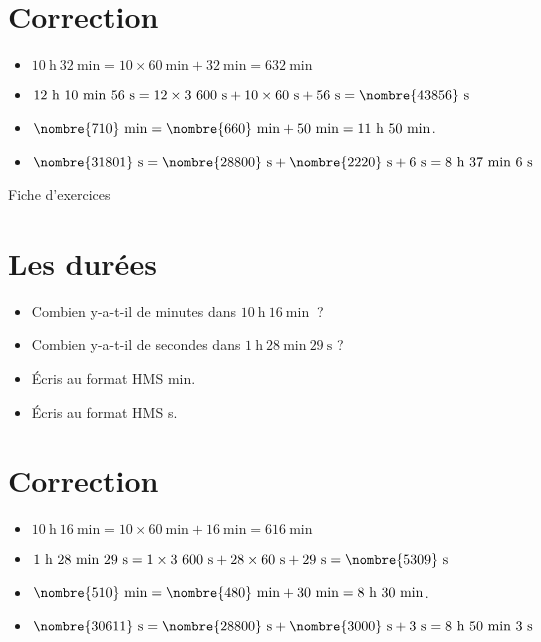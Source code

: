 \documentclass[a4paper,11pt,fleqn]{article}
\begin{document}
\section{Correction}
\begin{itemize}
 \item $10~\text{h}~32~\text{min}=10\times60~\text{min}+32~\text{min}=632~\text{min}$
  \item $12~\text{h}~10~\text{min}~56~\text{s}=12\times3~600~\text{s}+10\times60~\text{s}+56~\text{s}=\nombre{43856}~\text{s}$
  \item $\nombre{710}~\text{min}=\nombre{660}~\text{min}+50~\text{min}=11~\text{h}~50~\text{min}$.
  \item $\nombre{31801}~\text{s}=\nombre{28800}~\text{s}+\nombre{2220}~\text{s}+6~\text{s}=8~\text{h}~37~\text{min}~6~\text{s}$ \end{itemize}


\newpage
\setcounter{exo}{0}
\setcounter{section}{0}
\begin{center}
	{\huge Fiche d'exercices } 	
\end{center}


\section{Les durées}
\begin{itemize}
  \item Combien y-a-t-il de minutes dans $10~\text{h}~16~\text{min}~$ ?
  \item Combien y-a-t-il de secondes dans $1~\text{h}~28~\text{min}~29~\text{s}$ ?
  \item Écris au format HMS  min.
  \item Écris au format HMS  s.
\end{itemize}

\section{Correction}
\begin{itemize}
 \item $10~\text{h}~16~\text{min}=10\times60~\text{min}+16~\text{min}=616~\text{min}$
  \item $1~\text{h}~28~\text{min}~29~\text{s}=1\times3~600~\text{s}+28\times60~\text{s}+29~\text{s}=\nombre{5309}~\text{s}$
  \item $\nombre{510}~\text{min}=\nombre{480}~\text{min}+30~\text{min}=8~\text{h}~30~\text{min}$.
  \item $\nombre{30611}~\text{s}=\nombre{28800}~\text{s}+\nombre{3000}~\text{s}+3~\text{s}=8~\text{h}~50~\text{min}~3~\text{s}$ \end{itemize}
\end{document}
